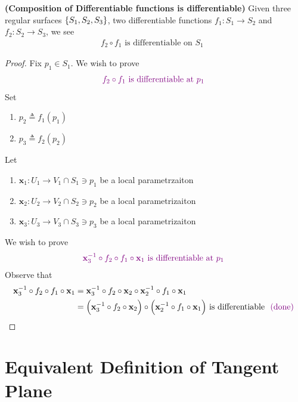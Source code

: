\documentclass{report}
\begin{document}
\begin{mdframed}

\end{mdframed}
\begin{theorem}
\label{CoD}
\textbf{(Composition of Differentiable functions is differentiable)} Given three regular surfaces $\{ S_1,S_2,S_3 \}$, two differentiable functions $f_1:S_1\rightarrow S_2$ and $f_2:S_2\rightarrow S_3$, we see 
\begin{align*}
f_2\circ f_1\text{ is differentiable on $S_1$ }
\end{align*}
\end{theorem}
\begin{proof}
Fix $p_1\in S_1 $. We wish to prove 
\begin{align*}
  \textcolor{violet}{f_2\circ f_1\text{ is differentiable at $p_1$ }}
\end{align*}
Set 
\begin{enumerate}[label=(\alph*)]
  \item $p_2\triangleq f_1(p_1)$ 
  \item $p_3\triangleq f_2(p_2)$
\end{enumerate}
Let 
\begin{enumerate}[label=(\alph*)]
  \item $\textbf{x}_1:U_1 \rightarrow V_1\cap S_1 \ni p_1 $ be a local parametrzaiton 
   \item $\textbf{x}_2:U_2\rightarrow V_2\cap S_2\ni p_2$ be a local parametrizaiton 
    \item $\textbf{x}_3:U_3\rightarrow V_3\cap S_3\ni p_3$ be a local parametrizaiton 
\end{enumerate}
We wish to prove 
\begin{align*}
  \textcolor{violet}{\textbf{x}_3^{-1}\circ f_2\circ f_1 \circ \textbf{x}_1\text{ is differentiable at $p_1$ }}
\end{align*}
Observe that 
\begin{align*}
\textbf{x}_3^{-1}\circ f_2\circ f_1\circ \textbf{x}_1&=\textbf{x}_3^{-1}\circ f_2 \circ \textbf{x}_2 \circ \textbf{x}_2^{-1} \circ f_1 \circ \textbf{x}_1\\
&=\Big(\textbf{x}_3^{-1}\circ f_2\circ \textbf{x}_2 \Big)\circ \Big(\textbf{x}_2^{-1}\circ f_1\circ \textbf{x}_1 \Big)\text{ is differentiable $\textcolor{violet}{\text{ (done) }}$}
\end{align*}
\end{proof}

\section{Equivalent Definition of Tangent Plane}
\end{document}
